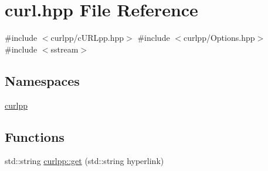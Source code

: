 \hypertarget{a00008}{}\section{curl.\+hpp File Reference}
\label{a00008}
{\ttfamily \#include $<$curlpp/c\+U\+R\+Lpp.\+hpp$>$}\newline
{\ttfamily \#include $<$curlpp/\+Options.\+hpp$>$}\newline
{\ttfamily \#include $<$sstream$>$}\newline
\subsection*{Namespaces}
\begin{DoxyCompactItemize}
\item 
 \hyperlink{a00041}{curlpp}
\end{DoxyCompactItemize}
\subsection*{Functions}
\begin{DoxyCompactItemize}
\item 
std\+::string \hyperlink{a00041_acbba0862979b2ae3a4d2a73369f42820}{curlpp\+::get} (std\+::string hyperlink)
\end{DoxyCompactItemize}
